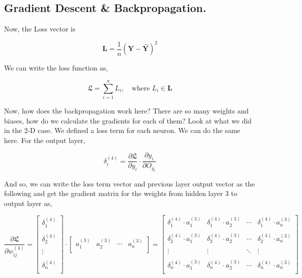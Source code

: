 \documentclass[12pt]{article}
\begin{document}
\newpage
\subsection*{Gradient Descent \& Backpropagation.}

Now, the Loss vector is

\[
  \mathbf{L}  = \frac{1}{n}(\mathbf{Y} - \hat{\mathbf{Y}}) ^2
\]

We can write the loss function as, 

\[
  \mathfrak{L} = \sum_{i=1}^{n} L_i, \quad \text{where } L_i \in \mathbf{L}
\]

Now, how does the backpropagation work here? There are so many weights and biases, how do we calculate the gradients for each of them? Look at what we did in the 2-D case. We defined a loss term for each neuron. We can do the same here. For the output layer, 

\[
  \delta_i ^{(4)} = \dfrac{\partial \mathfrak{L} }{\partial y_i} \cdot \dfrac{\partial y_{i} }{\partial O_{y_i} } 
\]

And so, we can write the loss term vector and previous layer output vector as the following and get the gradient matrix for the weights from hidden layer 3 to output layer as,

\[
  \dfrac{\partial \mathfrak{L} }{\partial w_{ij}^{(4)}} = \begin{bmatrix}
     \delta_1 ^{(4)} \\
     \\
     \delta_2 ^{(4)} \\
     \\
     \vdots\\
     \\
     \delta_n ^{(4)} \\
  \end{bmatrix} \cdot \begin{bmatrix}
     a_1 ^{(3)} &  a_2 ^{(3)} & \cdots & a_n ^{(3)} \\
  \end{bmatrix} = 
    \begin{bmatrix}
      \delta_1 ^{(4)} \cdot a_1 ^{(3)} & \delta_1 ^{(4)} \cdot a_2 ^{(3)}  & \cdots & \delta_1 ^{(4)} \cdot a_n ^{(3)} \\
      \\
      \delta_2 ^{(4)} \cdot a_1 ^{(3)} & \delta_2 ^{(4)} \cdot a_2 ^{(3)}  & \cdots & \delta_2 ^{(4)} \cdot a_n ^{(3)} \\
      \\
      \vdots & \vdots & \ddots & \vdots \\
      \\
      \delta_n ^{(4)} \cdot a_1 ^{(3)} & \delta_n ^{(4)} \cdot a_2 ^{(3)}  & \cdots & \delta_n ^{(4)} \cdot a_n ^{(3)} \\
    \end{bmatrix}
\]
\end{document}
